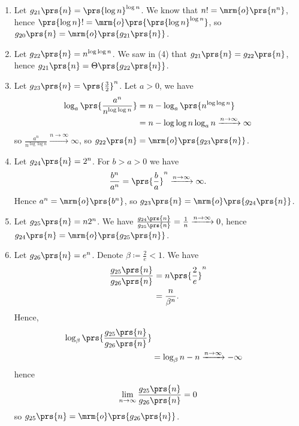 \documentclass[oneside]{scrbook}
\theoremstyle{definition}
\begin{document}
\begin{problem}
\begin{enumerate}[label=\alph*.]
\begin{enumerate}[label=\arabic*.]
\item Let $g_{21}\prs{n} = \prs{\log n}^{\log n}$.
We know that $n! = \mrm{o}\prs{n^n}$, hence $\prs{\log n}! = \mrm{o}\prs{\prs{\log n}^{\log n}}$, so $g_{20}\prs{n} = \mrm{o}\prs{g_{21}\prs{n}}$.

\item Let $g_{22}\prs{n} = n^{\log \log n}$. We saw in (4) that $g_{21}\prs{n} = g_{22}\prs{n}$, hence $g_{21}\prs{n} = \Theta\prs{g_{22}\prs{n}}$.

\item Let $g_{23}\prs{n} = \prs{\frac{3}{2}}^n$. Let $a > 0$, we have
\begin{align*}
\log_a \prs{\frac{a^n}{n^{\log \log n}}} &= n - \log_a\prs{n^{\log \log n}}
\\&= n - \log \log n \log_a n \xrightarrow{n\to\infty} \infty
\end{align*}
so $\frac{a^n}{n^{\log \log n}} \xrightarrow{n \to \infty} \infty$, so $g_{22}\prs{n} = \mrm{o}\prs{g_{23}\prs{n}}$.

\item Let $g_{24}\prs{n} = 2^n$. For $b > a > 0$ we have
\begin{align*}
\frac{b^n}{a^n} = \prs{\frac{b}{a}}^n \xrightarrow{n \to \infty} \infty \text{.}
\end{align*}
Hence $a^n = \mrm{o}\prs{b^n}$, so $g_{23}\prs{n} = \mrm{o}\prs{g_{24}\prs{n}}$.

\item Let $g_{25}\prs{n} = n 2^n$. We have $\frac{g_{24}\prs{n}}{g_{25}\prs{n}} = \frac{1}{n} \xrightarrow{n\to\infty} 0$, hence $g_{24}\prs{n} = \mrm{o}\prs{g_{25}\prs{n}}$.

\item Let $g_{26}\prs{n} = e^n$. Denote $\beta \coloneqq \frac{2}{e} < 1$. We have
\begin{align*}
\frac{g_{25}\prs{n}}{g_{26}\prs{n}} &= n \prs{\frac{2}{e}}^n
\\&= \frac{n}{\beta^n} \text{.}
\end{align*}
Hence,
\begin{align*}
\log_\beta\prs{\frac{g_{25}\prs{n}}{g_{26}\prs{n}}}
\\&=
\log_\beta n - n \xrightarrow{n\to\infty} - \infty
\end{align*}
hence
\begin{align*}
\lim_{n\to\infty} \frac{g_{25}\prs{n}}{g_{26}\prs{n}} = 0
\end{align*}
so $g_{25}\prs{n} = \mrm{o}\prs{g_{26}\prs{n}}$.


\end{enumerate}
\end{enumerate}
\end{problem}
\end{document}
